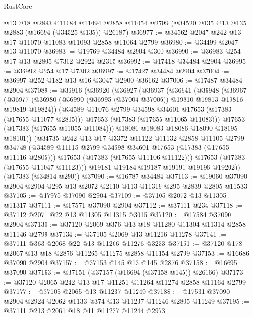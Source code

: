 \begin{lexlean}{RustCore}
\begin{coremodule}
    @13
    @18
    @2883
    @11084
    @11094
    @2858
    @11054
    @2799
    (@34520 @135 @13 @135 @2883 (@16694 (@34525 @135)) @26187)
@36977 := @34562 @2047 @242 @13 @17 @11070 @11083 @11093 @2858 @11064 @2799
@36980 := @34499 @2047 @13 @11070
@36983 := @19769 @34484 @2904 @300
@36990 := @36983 @254 @17 @13 @2805 @7302 @2924 @2315
@36992 := @17418 @34484 @2904
@36995 := @36992 @254 @17 @7302
@36997 := @17427 @34484 @2904
@37004 := @36997 @252 @182 @13 @16 @3047 @2900 @36162
@37006 := @17487 @34484 @2904
@37089 := @36916
    (@36920
      (@36927
        (@36937
          (@36941
            (@36948
              (@36967
                (@36977
                  (@36980 (@36990 (@36995 (@37004 @37006)) @19810 @19813 @19816 @19819 @19824))
                  (@34589 @11076 @2799 @34598 @34601 @17653 (@17383 (@17655 @11077 @2805)))
                  @17653
                  (@17383 (@17655 @11065 @11083)))
                @17653
                (@17383 (@17655 @11055 @11084)))
              @18080
              @18083
              @18086
              @18090
              @18095
              @18101))
          (@34735
            @242
            @13
            @17
            @3372
            @11122
            @11132
            @2858
            @11105
            @2799
            @34748
            (@34589 @11115 @2799 @34598 @34601 @17653 (@17383 (@17655 @11116 @2805)))
            @17653
            (@17383 (@17655 @11106 @11122)))
          @17653
          (@17383 (@17655 @11047 @11123)))
        @19181
        @19184
        @19187
        @19191
        @19196
        @19202))
    (@17383 (@34814 @290))
@37090 := @16787 @34484
@37103 := @19060 @37090 @2904 @2904 @295 @13 @2072 @2110 @113 @11319 @295 @2839 @2805 @11533
@37105 := @17975 @37090 @2904
@37109 := @37105 @2072 @13 @11305 @11317
@37111 := @17571 @37090 @2904
@37112 := @37111 @234
@37118 := @37112 @2071 @22 @13 @11305 @11315 @3015
@37120 := @17584 @37090 @2904
@37130 := @37120 @2069 @376 @13 @18 @11280 @11304 @11314 @2858 @11146 @2799
@37134 := @37105 @2069 @13 @11266 @11278
@37141 := @37111 @363 @2068 @22 @13 @11266 @11276 @3233
@37151 := @37120 @178 @2067 @13 @18 @2876 @11265 @11275 @2858 @11154 @2799
@37153 := @16686 @37090 @2904
@37157 := @37153 @145 @13 @145 @2876
@37158 := @16695 @37090
@37163 := @37151 (@37157 (@16694 (@37158 @145)) @26166)
@37173 := @37120 @2065 @242 @13 @17 @11251 @11264 @11274 @2858 @11164 @2799
@37177 := @37105 @2065 @13 @11237 @11249
@37188 := @17531 @37090 @2904 @2924 @2062 @1133 @374 @13 @11237 @11246 @2805 @11249
@37195 := @37111 @213 @2061 @18 @11 @11237 @11244 @2973

\end{coremodule}
\end{lexlean}
